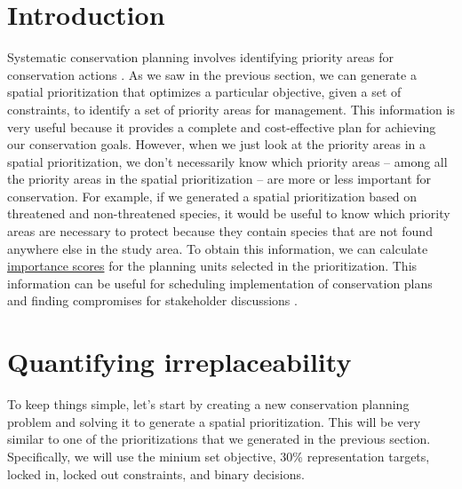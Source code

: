 \documentclass[
  12pt,
]{book}
\begin{document}
\hypertarget{introduction-3}{%
\section{Introduction}\label{introduction-3}}

Systematic conservation planning involves identifying priority areas for conservation actions \citep{r13}. As we saw in the previous section, we can generate a spatial prioritization that optimizes a particular objective, given a set of constraints, to identify a set of priority areas for management. This information is very useful because it provides a complete and cost-effective plan for achieving our conservation goals. However, when we just look at the priority areas in a spatial prioritization, we don't necessarily know which priority areas -- among all the priority areas in the spatial prioritization -- are more or less important for conservation. For example, if we generated a spatial prioritization based on threatened and non-threatened species, it would be useful to know which priority areas are necessary to protect because they contain species that are not found anywhere else in the study area. To obtain this information, we can calculate \href{https://prioritizr.net/reference/importance.html}{importance scores} for the planning units selected in the prioritization. This information can be useful for scheduling implementation of conservation plans and finding compromises for stakeholder discussions \citep{r5}.

\hypertarget{quantifying-irreplaceability}{%
\section{Quantifying irreplaceability}\label{quantifying-irreplaceability}}

To keep things simple, let's start by creating a new conservation planning problem and solving it to generate a spatial prioritization. This will be very similar to one of the prioritizations that we generated in the previous section. Specifically, we will use the minium set objective, 30\% representation targets, locked in, locked out constraints, and binary decisions.

\clearpage
\end{document}
